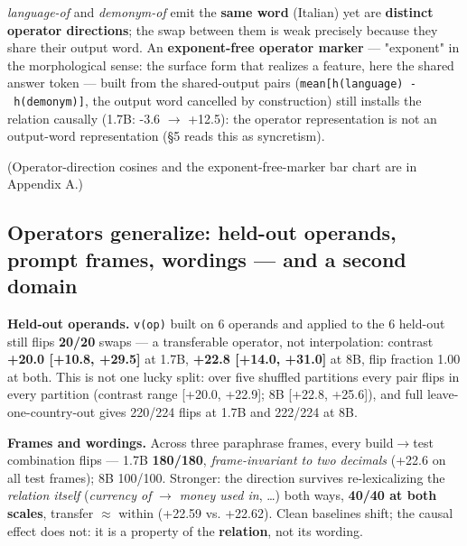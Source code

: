 \emph{language-of} and \emph{demonym-of} emit the \textbf{same word}
(Italian) yet are \textbf{distinct operator directions}; the swap
between them is weak precisely because they share their output word. An
\textbf{exponent-free operator marker} --- "exponent" in the
morphological sense: the surface form that realizes a feature, here the
shared answer token --- built from the shared-output pairs
(\texttt{mean{[}h(language)\ -\ h(demonym){]}}, the output word
cancelled by construction) still installs the relation causally (1.7B:
-3.6 \ensuremath{\to} +12.5): the operator representation is not an output-word
representation (\S{}5 reads this as syncretism).

(Operator-direction cosines and the exponent-free-marker bar chart are
in Appendix A.)

\subsection{Operators generalize: held-out operands, prompt frames,
wordings --- and a second
domain}

\textbf{Held-out operands.} \texttt{v(op)} built on 6 operands and
applied to the 6 held-out still flips \textbf{20/20} swaps --- a
transferable operator, not interpolation: contrast \textbf{+20.0
{[}+10.8, +29.5{]}} at 1.7B, \textbf{+22.8 {[}+14.0, +31.0{]}} at 8B,
flip fraction 1.00 at both. This is not one lucky split: over five
shuffled partitions every pair flips in every partition (contrast range
{[}+20.0, +22.9{]}; 8B {[}+22.8, +25.6{]}), and full
leave-one-country-out gives 220/224 flips at 1.7B and 222/224 at 8B.

\textbf{Frames and wordings.} Across three paraphrase frames, every
build\ensuremath{\to}test combination flips --- 1.7B \textbf{180/180},
\emph{frame-invariant to two decimals} (+22.6 on all test frames); 8B
100/100. Stronger: the direction survives re-lexicalizing the
\emph{relation itself} (\emph{currency of} \ensuremath{\to} \emph{money used in},
\ldots) both ways, \textbf{40/40 at both scales}, transfer \ensuremath{\approx} within
(+22.59 vs. +22.62). Clean baselines shift; the causal effect does not:
it is a property of the \textbf{relation}, not its wording.

